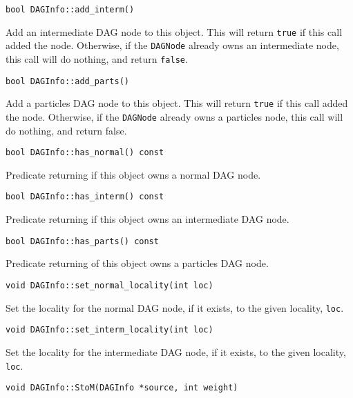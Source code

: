 \begin{lstlisting}
bool DAGInfo::add_interm()
\end{lstlisting}

\noindent Add an intermediate DAG node to this object. This will return
\texttt{true} if this call added the node. Otherwise, if the \texttt{DAGNode}
already owns an intermediate node, this call will do nothing, and return
\texttt{false}.

\begin{lstlisting}
bool DAGInfo::add_parts()
\end{lstlisting}

\noindent Add a particles DAG node to this object. This will return
\texttt{true} if this call added the node. Otherwise, if the \texttt{DAGNode}
already owns a particles node, this call will do nothing, and return false.

\begin{lstlisting}
bool DAGInfo::has_normal() const
\end{lstlisting}

\noindent Predicate returning if this object owns a normal DAG node.

\begin{lstlisting}
bool DAGInfo::has_interm() const
\end{lstlisting}

\noindent Predicate returning if this object owns an intermediate DAG node.

\begin{lstlisting}
bool DAGInfo::has_parts() const
\end{lstlisting}

\noindent Predicate returning of this object owns a particles DAG node.

\begin{lstlisting}
void DAGInfo::set_normal_locality(int loc)
\end{lstlisting}

\noindent Set the locality for the normal DAG node, if it exists, to the given
locality, \texttt{loc}.

\begin{lstlisting}
void DAGInfo::set_interm_locality(int loc)
\end{lstlisting}

\noindent Set the locality for the intermediate DAG node, if it exists, to
the given locality, \texttt{loc}.

\begin{lstlisting}
void DAGInfo::StoM(DAGInfo *source, int weight)
\end{lstlisting}

